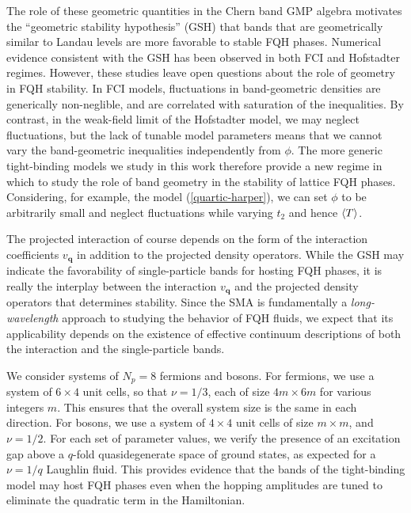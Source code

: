 \documentclass[aps,prb,twocolumn,letterpaper,twoside,nobalancelastpage,groupedaddress,amsmath,amssymb,floatfix,citeautoscript]{revtex4-1}
\begin{document}
The role of these geometric quantities in the Chern band GMP algebra motivates the ``geometric stability hypothesis'' (GSH)\cite{roy_band_2014,jackson_geometric_2015} that bands that are geometrically similar to Landau levels are more favorable to stable FQH phases. Numerical evidence consistent with the GSH has been observed in both FCI \cite{jackson_geometric_2015} and Hofstadter regimes\cite{bauer_quantum_2016}. However, these studies leave open questions about the role of geometry in FQH stability. In FCI models, fluctuations in band-geometric densities are generically non-neglible, and are correlated with saturation of the inequalities. By contrast, in the weak-field limit of the Hofstadter model, we may neglect fluctuations, but the lack of tunable model parameters means that we cannot vary the band-geometric inequalities independently from $\phi$. The more generic tight-binding models we study in this work therefore provide a new regime in which to study the role of band geometry in the stability of lattice FQH phases. Considering, for example, the model (\ref{quartic-harper}), we can set $\phi$ to be arbitrarily small and neglect fluctuations while varying $t_2$ and hence $\expval{T}$.

The projected interaction of course depends on the form of the interaction coefficients $v_{\mathbf{q}}$ in addition to the projected density operators. While the GSH may indicate the favorability of single-particle bands for hosting FQH phases, it is really the interplay between the interaction $v_\mathbf{q}$ and the projected density operators that determines stability. Since the SMA is fundamentally a \textit{long-wavelength} approach to studying the behavior of FQH fluids, we expect that its applicability depends on the existence of effective continuum descriptions of both the interaction and the single-particle bands.

We consider systems of $N_p = 8$ fermions and bosons. For fermions, we use a system of $6 \times 4$ unit cells, so that $\nu=1/3$, each of size $4m \times 6m$ for various integers $m$. This ensures that the overall system size is the same in each direction. For bosons, we use a system of $4 \times 4$ unit cells of size $m \times m$, and $\nu=1/2$. For each set of parameter values, we verify the presence of an excitation gap above a $q$-fold quasidegenerate space of ground states, as expected for a $\nu=1/q$ Laughlin fluid. This provides evidence that the bands of the tight-binding model may host FQH phases even when the hopping amplitudes are tuned to eliminate the quadratic term in the Hamiltonian. 
\end{document}
